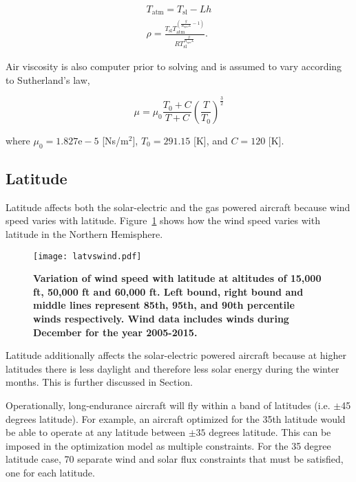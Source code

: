 \documentclass[]{aiaa-tc}%
\begin{document}
\begin{align}
    \label{e:Talt}
    T_{\text{atm}} = T_{\text{sl}} - Lh \\
    \label{e:rhot}
    \rho = \frac{T_{\text{sl}}T_{\text{atm}}^{\left( \frac{g}{R_{\text{spec}}L} -1 \right)}}{R T_{\text{sl}}^{\frac{g}{R_{\text{spec}}L}}}.
\end{align}

Air viscosity is also computer prior to solving and is assumed to vary according to Sutherland's law,\cite{fluiddyhandbook}

\begin{equation}
    \label{e:sutherland}
    \mu = \mu_0 \frac{T_0 + C}{T+C} \left( \frac{T}{T_0} \right)^{\frac{3}{2}}
\end{equation}

where $\mu_0 = 1.827\text{e}-5$ [Ns/m$^2$], $T_0 = 291.15$ [K], and $C = 120$ [K].

\subsection{Latitude}

Latitude affects both the solar-electric and the gas powered aircraft because wind speed varies with latitude. 
Figure~\ref{f:latvswind} shows how the wind speed varies with latitude in the Northern Hemisphere. 

\begin{figure}[H]
	\begin{center}
	\texttt{[image: latvswind.pdf]}
    \caption{\textbf{Variation of wind speed with latitude at altitudes of 15,000 ft, 50,000 ft and 60,000 ft.  Left bound, right bound and middle lines represent 85th, 95th, and 90th percentile winds respectively. Wind data includes winds during December for the year 2005-2015.}}
	\label{f:latvswind}
	\end{center}
\end{figure}

Latitude additionally affects the solar-electric powered aircraft because at higher latitudes there is less daylight and therefore less solar energy during the winter months. This is further discussed in Section.

Operationally, long-endurance aircraft will fly within a band of latitudes (i.e. $\pm$45 degrees latitude).  
For example, an aircraft optimized for the 35th latitude would be able to operate at any latitude between $\pm35$ degrees latitude. 
This can be imposed in the optimization model as multiple constraints. For the 35 degree latitude case, 70 separate wind and solar flux constraints that must be satisfied, one for each latitude.
\end{document}
